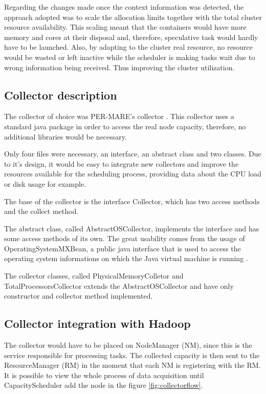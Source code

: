 Regarding the changes made once the context information was detected, the approach adopted was to scale the allocation limits together with the total cluster resource availability. This scaling meant that the containers would have more memory and cores at their disposal and, therefore, speculative task would hardly have to be launched. Also, by adapting to the cluster real resource, no resource would be wasted or left inactive while the scheduler is making tasks wait due to wrong information being received. Thus improving the cluster utilization.

\subsection{Collector description}
The collector of choice was PER-MARE's collector \cite{Collector}. This collector uses a standard java package in order to access the real node capacity, therefore, no additional libraries would be necessary.
 
Only four files were necessary, an interface, an abstract class and two classes. Due to it's design, it would be easy to integrate new collectors and improve the resources available for the scheduling process, providing data about the CPU load or disk usage for example.

The base of the collector is the interface Collector, which has two access methods and the collect method. 

The abstract class, called AbstractOSCollector, implements the interface and has some access methods of its own. The great usability comes from the usage of OperatingSystemMXBean, a public java interface that is used to access the operating system informations on which the Java virtual machine is running \cite{MXBean}.

The collector classes, called PhysicalMemoryColletor and TotalProcessorsCollector extends the AbstractOSCollector and have only constructor and collector method implemented.

\subsection{Collector integration with Hadoop}
The collector would have to be placed on NodeManager (NM), since this is the service responsible for processing tasks. The collected capacity is then sent to the ResourceManager (RM) in the moment that each NM is registering with the RM. It is possible to view the whole process of data acquisition until CapacityScheduler add the node in the figure \ref{fig:collectorflow}.

